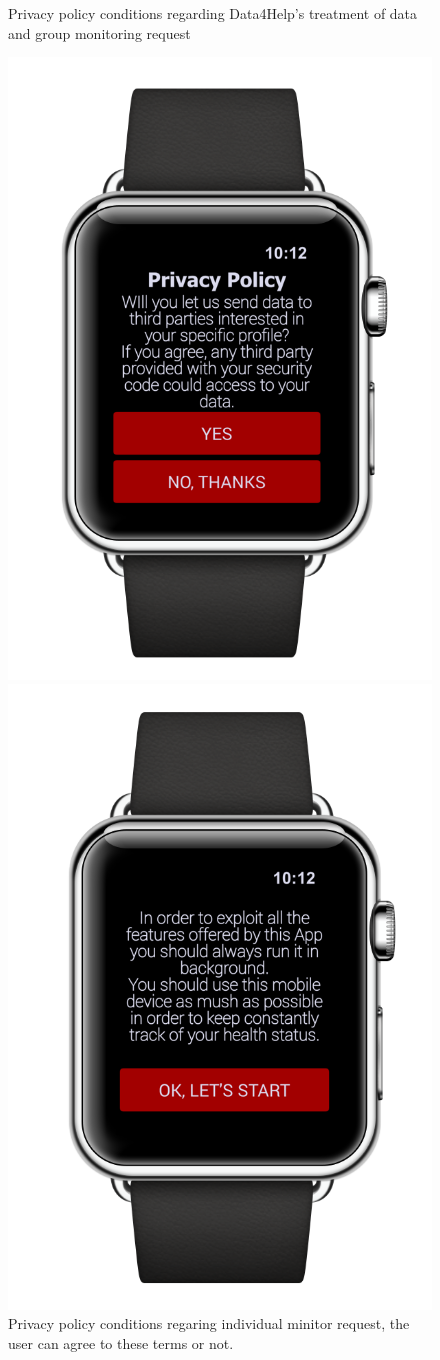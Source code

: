 \begin{enumerate}
\begin{figure}[H]
\begin{center}
\begin{minipage}[c]{.40\textwidth}
	\caption{Privacy policy conditions regarding Data4Help's treatment of data and group monitoring request}
        \end{minipage}
      \end{center}
\end{figure}
\begin{figure}[H]
\begin{center}
        \begin{minipage}[c]{.40\textwidth}
	\centering
          \includegraphics[height=9 cm]{Images/Mockups/AutomatedSOSMockup3.png}
	\caption{Privacy policy conditions regaring individual minitor request, the user can agree to these terms or not. }
        \end{minipage}%
        \hspace{10mm}%
        \begin{minipage}[c]{.40\textwidth}
	\centering
          \includegraphics[height=9 cm]{Images/Mockups/AutomatedSOSMockup4.png}

\end{minipage}
\end{center}
\end{figure}
\end{enumerate}
